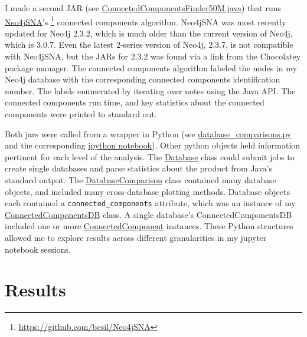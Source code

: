 \documentclass[12pt]{article}
\begin{document}
I made a second JAR (see \href{https://github.com/JanetMatsen/Neo4j_meta4/blob/master/data_mining_Neo4j_v2_3_2/src/ConnectedComponentsFinder50M.java}{ConnectedComponentsFinder50M.java}) that runs \href{https://github.com/besil/Neo4jSNA}{Neo4jSNA}'s \footnote{\url{https://github.com/besil/Neo4jSNA}} connected components algorithm.
Neo4jSNA was most recently updated for Neo4j 2.3.2, which is much older than the current version of Neo4j, which is 3.0.7. 
Even the latest 2-series version of Neo4j, 2.3.7, is not compatible with Neo4jSNA, but the JARs for 2.3.2 was found via a link from the Chocolatey package manager.
The connected components algorithm labeled the nodes in my Neo4j database with the corresponding connected components identification number.
The labels enumerated by iterating over notes using the Java API.
The connected components run time, and key statistics about the connected components were printed to standard out. 

Both jars were called from a wrapper in Python (see \href{https://github.com/JanetMatsen/Neo4j_meta4/blob/master/code/database_comparisons.py}{database\_comparisons.py} and the corresponding \href{https://github.com/JanetMatsen/Neo4j_meta4/blob/master/jupyter/build_graphs_and_find_connected_components_50M.ipynb}{ipython notebook}).
Other python objects held information pertinent for each level of the analysis.  
The \href{https://github.com/JanetMatsen/Neo4j_meta4/blob/master/code/database_comparisons.py}{Database} class could submit jobs to create single databases and parse statistics about the product from Java's standard output.
The \href{https://github.com/JanetMatsen/Neo4j_meta4/blob/master/code/database_comparisons.py}{DatabaseComparison} class contained many database objects, and included many cross-database plotting methods.
Database objects each contained a \texttt{connected\_components} attribute, which was an instance of my \href{https://github.com/JanetMatsen/Neo4j_meta4/blob/master/code/connected_component.py}{ConnectedComponentsDB} class.
A single database's ConnectedComponentsDB included one or more \href{https://github.com/JanetMatsen/Neo4j_meta4/blob/master/code/connected_component.py}{ConnectedComponent} instances.
These Python structures allowed me to explore results across different granularities in my jupyter notebook sessions.

\section{Results}  
\end{document}
